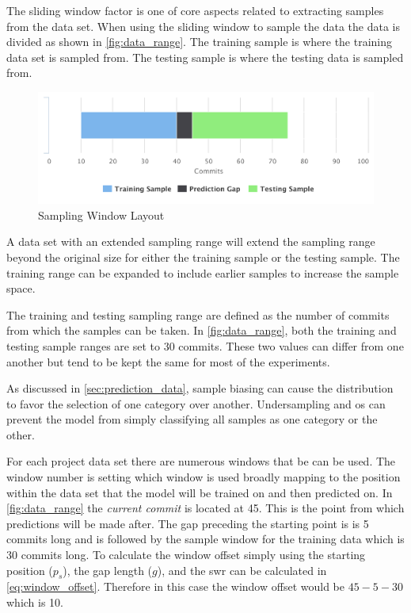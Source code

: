 
The sliding window factor is one of core aspects related to extracting samples from the data set. When using the sliding window to sample the data the data is divided as shown in \autoref{fig:data_range}. The training sample is where the training data set is sampled from. The testing sample is where the testing data is sampled from. 

\begin{figure}[!ht]
    \centering
        \includegraphics[width=1.0\textwidth]{images/exp_data_range}
    \caption{Sampling Window Layout}
    \label{fig:data_range}
\end{figure}


A data set with an extended sampling range will extend the sampling range beyond the original size for either the training sample or the testing sample. The training range can be expanded to include earlier samples to increase the sample space.

The training and testing sampling range are defined as the number of commits from which the samples can be taken. In \autoref{fig:data_range}, both the training and testing sample ranges are set to 30 commits. These two values can differ from one another but tend to be kept the same for most of the experiments.

As discussed in \autoref{sec:prediction_data}, sample biasing can cause the distribution to favor the selection of one category over another. Undersampling and \gls{os} can prevent the model from simply classifying all samples as one category or the other.

For each project data set there are numerous windows that be can be used. The window number is setting which window is used broadly mapping to the position within the data set that the model will be trained on and then predicted on. In \autoref{fig:data_range} the \textit{current commit} is located at 45. This is the point from which predictions will be made after. The gap preceding the starting point is is 5 commits long and is followed by the sample window for the training data which is 30 commits long. To calculate the window offset simply using the starting position ($p_s$), the gap length ($g$), and the \gls{swr} can be calculated in \autoref{eq:window_offset}. Therefore in this case the window offset would be $45 - 5 - 30$ which is 10.

